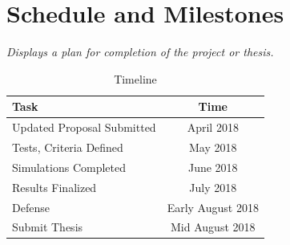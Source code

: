 \documentclass {article}
\newcommand{\sechint}[1]{\small{\emph{#1}} \bigskip}
\begin{document}
\pagebreak
\section{Schedule and Milestones}{\sechint{Displays a plan for completion of the project or thesis.}}

\begin{table}[!ht]
	\centering
	\begin{tabular}{l|c}
		\hline
		Task & Time \\ \hline \hline
		Updated Proposal Submitted & April 2018 \\ \hline
		Tests, Criteria Defined & May 2018 \\ \hline
		Simulations Completed & June 2018 \\ \hline
		Results Finalized & July 2018 \\ \hline
		Defense & Early August 2018 \\ \hline
		Submit Thesis & Mid August 2018 \\ \hline
	\end{tabular}
	\caption{Timeline}
\end{table}
\end{document}
